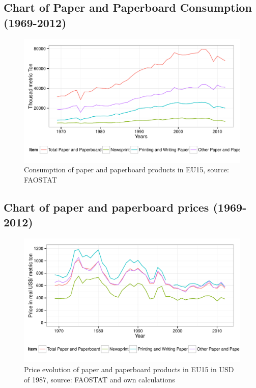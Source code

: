 \documentclass{scrartcl}\usepackage{graphicx, color}
\newenvironment{knitrout}{}{} %
\begin{document}
\subsection{Chart of Paper and Paperboard Consumption (1969-2012)}
\begin{knitrout}
\color{fgcolor}\begin{figure}[h]


{\centering \includegraphics[width=.7\linewidth]{figure/ConsumptionEU15Extended} 

}

\caption[Consumption of paper and paperboard products in EU15, source]{Consumption of paper and paperboard products in EU15, source: FAOSTAT\label{fig:ConsumptionEU15Extended}}
\end{figure}


\end{knitrout}




\subsection{Chart of paper and paperboard prices (1969-2012)}

\begin{knitrout}
\color{fgcolor}\begin{figure}[h]


{\centering \includegraphics[width=.7\linewidth]{figure/PriceEU15Extended} 

}

\caption[Price evolution of paper and paperboard products in EU15 in USD of 1987, source]{Price evolution of paper and paperboard products in EU15 in USD of 1987, source: FAOSTAT and own calculations\label{fig:PriceEU15Extended}}
\end{figure}


\end{knitrout}
\end{document}

